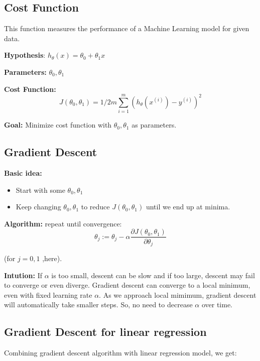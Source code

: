 \documentclass[12pt, A4]{report}
\begin{document}
  \subsection*{Cost Function}
    This function measures the performance of a Machine Learning model for given data.

    \textbf{Hypothesis}: $ h_ \theta(x) = \theta_0 + \theta_1x $

    \textbf{Parameters:} $ \theta_0, \theta_1 $

    \textbf{Cost Function:} 
    \begin{equation} \label {eq:1}
        J( \theta_0, \theta_1 ) = 1/2m \sum_{i=1}^{m} (h_\theta(x^{(i)})-y^{(i)})^2 
    \end{equation} 

    \textbf{Goal:} Minimize cost function with $ \theta_0, \theta_1 $ as parameters.

  \subsection*{Gradient Descent}

    \textbf{Basic idea:}
    \begin{itemize}
    \item Start with some $ \theta_0, \theta_1 $
    \item Keep changing $ \theta_0, \theta_1 $ to reduce $ J(\theta_0, \theta_1) $ until we end up at minima.
    \end{itemize} 

    \textbf{Algorithm:}
     repeat until convergence:
    \begin{equation} \label {eq:2}
        \theta_j := \theta_j - \alpha \frac{\partial {J(\theta_0, \theta_1)}}{\partial \theta_j}
    \end{equation} 

    (for  $j = 0, 1 $  ,here).  

    \textbf{Intution:} 
    If $\alpha$ is too small, descent can be slow and if too large, descent may fail to converge or even diverge.
    Gradient descent can converge to a local minimum, even with fixed learning rate $\alpha$. As we approach local mimimum, gradient descent will automatically take smaller steps. So, no need to decrease $\alpha$ over time. 

  \subsection*{Gradient Descent for linear regression}
    Combining gradient descent algorithm with linear regression model, we get:
\end{document}
